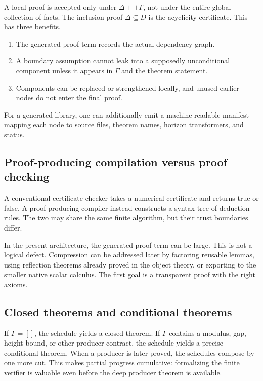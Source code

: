 A local proof is accepted only under \(\Delta++\Gamma\), not under the entire global
collection of facts.  The inclusion proof \(\Delta\subseteq D\) is the acyclicity
certificate.  This has three benefits.

\begin{enumerate}[label=(\roman*),leftmargin=2.4em]
\item The generated proof term records the actual dependency graph.
\item A boundary assumption cannot leak into a supposedly unconditional component
unless it appears in \(\Gamma\) and the theorem statement.
\item Components can be replaced or strengthened locally, and unused earlier nodes do
not enter the final proof.
\end{enumerate}

For a generated library, one can additionally emit a machine-readable manifest mapping
each node to source files, theorem names, horizon transformers, and status.

\subsection{Proof-producing compilation versus proof checking}

A conventional certificate checker takes a numerical certificate and returns true or
false.  A proof-producing compiler instead constructs a syntax tree of deduction
rules.  The two may share the same finite algorithm, but their trust boundaries differ.

In the present architecture, the generated proof term can be large.  This is not a
logical defect.  Compression can be addressed later by factoring reusable lemmas,
using reflection theorems already proved in the object theory, or exporting to the
smaller native scalar calculus.  The first goal is a transparent proof with the right
axioms.

\subsection{Closed theorems and conditional theorems}

If \(\Gamma=[]\), the schedule yields a closed theorem.  If \(\Gamma\) contains a
modulus, gap, height bound, or other producer contract, the schedule yields a precise
conditional theorem.  When a producer is later proved, the schedules compose by one
more cut.  This makes partial progress cumulative: formalizing the finite verifier is
valuable even before the deep producer theorem is available.

